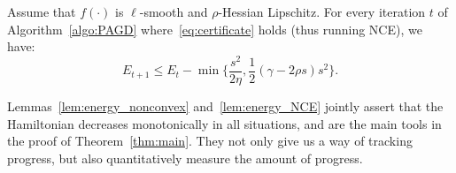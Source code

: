


\begin{lemma}\label{lem:energy_NCE}
Assume that $f(\cdot)$ is $\ell$-smooth and $\rho$-Hessian Lipschitz. For every iteration $t$ of Algorithm~\ref{algo:PAGD} where~\eqref{eq:certificate} holds (thus running NCE), we have:
\vspace{-0.15cm}
\begin{equation*}
E_{t+1}\le E_t -\min\{\frac{s^2}{2\eta},  \frac{1}{2}(\gamma - 2\rho s) s^2\}.
\end{equation*}
\end{lemma}
\vspace{-0.15cm}

Lemmas~\ref{lem:energy_nonconvex} and~\ref{lem:energy_NCE} jointly assert that the Hamiltonian decreases monotonically in all situations, and are the main tools in the proof of Theorem~\ref{thm:main}. They not only give us a way of tracking progress, but also quantitatively measure the amount of progress.






